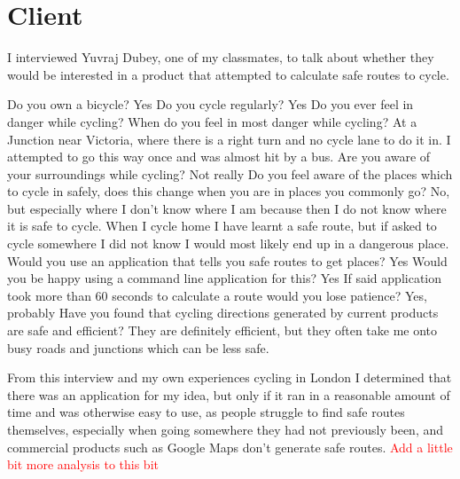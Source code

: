 \documentclass[11pt,twoside,a4paper]{report}
\begin{document}
\section{Client}
I interviewed Yuvraj Dubey, one of my classmates, to talk about whether they would be interested in a product that attempted to calculate safe routes to cycle. 
\begin{dialogue}
    Do you own a bicycle?
     Yes
     Do you cycle regularly?
     Yes
    Do you ever feel in danger while cycling?
    When do you feel in most danger while cycling?
    At a Junction near Victoria, where there is a right turn and no cycle lane to do it in. I attempted to go this way once and was almost hit by a bus.
    Are you aware of your surroundings while cycling?
    Not really
     Do you feel aware of the places which to cycle in safely, does this change when you are in places you commonly go?
    No, but especially where I don't know where I am because then I do not know where it is safe to cycle. When I cycle home I have learnt a safe route, but if asked to cycle somewhere I did not know I would most likely end up in a dangerous place.
    Would you use an application that tells you safe routes to get places?
    Yes
    Would you be happy using a command line application for this?
    Yes
    If said application took more than 60 seconds to calculate a route would you lose patience?
    Yes, probably
    Have you found that cycling directions generated by current products are safe and efficient?
    They are definitely efficient, but they often take me onto busy roads and junctions which can be less safe.
\end{dialogue}
From this interview and my own experiences cycling in London I determined that there was an application for my idea, but only if it ran in a reasonable amount of time and was otherwise easy to use, as people struggle to find safe routes themselves, especially when going somewhere they had not previously been, and commercial
products such as Google Maps don't generate safe routes. 
\textcolor{red}{Add a little bit more analysis to this bit}
\newpage
\end{document}
